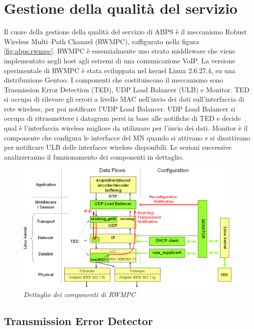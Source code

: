 \documentclass[12pt,a4paper,openright,twoside]{book}
\begin{document}
\section{Gestione della qualità del servizio}

Il cuore della gestione della qualità del servizio di ABPS è il
meccanismo Robust Wireless Multi--Path Channel (RWMPC), raffigurato
nella figura \ref{fig:abps:rwmpc}. RWMPC è essenzialmente uno strato
middleware che viene implementato negli host agli estremi di una
comunicazione VoIP. La versione sperimentale di RWMPC è stata
sviluppata nel kernel Linux 2.6.27.4, su una distribuzione Gentoo. I
componenti che costituiscono il meccanismo sono Trasmission Error
Detection (TED), UDP Load Balancer (ULB) e Monitor. TED si occupa di
rilevare gli errori a livello MAC nell'invio dei dati sull'interfaccia
di rete wireless, per poi notificare l'UDP Load Balancer. UDP Load
Balancer si occupa di ritrasmettere i datagram persi in base alle
notifiche di TED e decide qual è l'interfaccia wireless migliore da
utilizzare per l'invio dei dati. Monitor è il componente che configura
le interfacce del MN quando si attivano e si disattivano per
notificare ULB delle interfacce wireless disponibili. Le sezioni
successive analizzeranno il funzionamento dei componenti in dettaglio.

\begin{figure}
  \centering
  \includegraphics[width=\textwidth]{img/abps-rwmpc-funzionamento}
  \caption{\em Dettaglio dei componenti di RWMPC}
  \label{fig:abps:rwmpc-funzionamento}
\end{figure}

\subsection{Transmission Error Detector}
\end{document}
